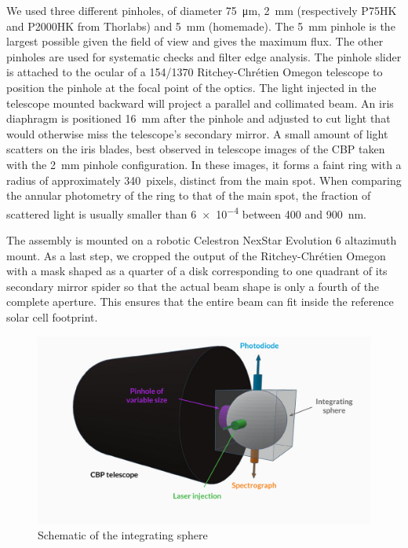 We used three different pinholes, of diameter \SI{75}{\micro\meter}, \SI{2}{\milli\meter} (respectively P75HK and P2000HK from Thorlabs) and \SI{5}{\milli\meter} (homemade). The \SI{5}{\mm} pinhole is the largest possible given the \SD field of view and gives the maximum flux. The other pinholes are used for systematic checks and filter edge analysis. The pinhole slider is attached to the ocular of a 154/1370 Ritchey-Chrétien Omegon telescope to position the pinhole at the focal point of the optics. The light injected in the telescope mounted backward will project a parallel and collimated beam. An iris diaphragm is positioned \SI{16}{mm} after the pinhole and adjusted to cut light that would otherwise miss the telescope's secondary mirror. A small amount of light scatters on the iris blades, best observed in telescope images of the CBP taken with the \SI{2}{mm} pinhole configuration. In these images, it forms a faint ring with a radius of approximately \SI{340}{pixels}, distinct from the main spot. When comparing the annular photometry of the ring to that of the main spot, the fraction of scattered light is usually smaller than \num{6e-4} between 400 and \SI{900}{nm}.

The assembly is mounted on a robotic Celestron NexStar Evolution 6 altazimuth mount. As a last step, we cropped the output of the Ritchey-Chrétien Omegon with a mask shaped as a quarter of a disk corresponding to one quadrant of its secondary mirror spider so that the actual beam shape is only a fourth of the complete aperture. This ensures that the entire beam can fit inside the reference solar cell footprint.

\begin{figure}
    \centering
    \includegraphics[width=1\columnwidth]{fig/integrating_sphere_3d.pdf}
    \caption{Schematic of the integrating sphere}
    \label{fig:sphere}
\end{figure}

